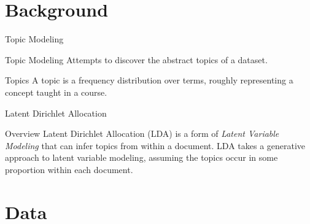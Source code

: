 \documentclass[10pt, compress]{beamer}
\begin{document}
\section{Background}


\begin{frame}{Topic Modeling}

  \begin{block}{Topic Modeling}
    Attempts to discover the abstract \alert{topics} of a dataset.
  \end{block}

  \begin{block}{Topics}
    A \alert{topic} is a frequency distribution over terms, roughly
    representing a concept taught in a course.
  \end{block}
\end{frame}


\begin{frame}{Latent Dirichlet Allocation}
  \begin{block}{Overview}
    \alert{Latent Dirichlet Allocation (LDA)} is a form of \emph{Latent
    Variable Modeling} that can infer topics from within a document.
    \vfill
    LDA takes a generative approach to latent variable modeling, assuming
    the topics occur in some proportion within each document.
  \end{block}
\end{frame}


\section{Data}
\end{document}
